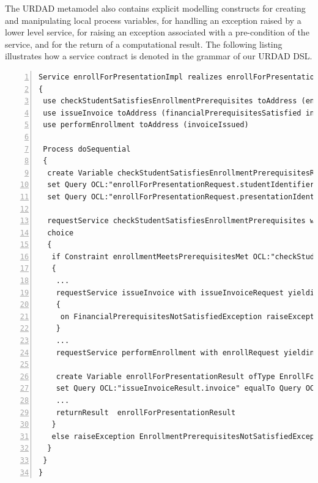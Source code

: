 The URDAD metamodel also contains explicit modelling constructs for creating and manipulating local process variables,  for handling an exception raised by a lower level service, for raising an exception associated with a pre-condition of the service, and for the return of a computational result. The following listing illustrates how a service contract is denoted in the grammar of our URDAD DSL.

\lstset{language=urdad,caption=Specifying a service in the textual URDAD DSL syntax.,label=serviceTextSyntax}
\begin{lstlisting}[numbers=left,escapechar=|]
Service enrollForPresentationImpl realizes enrollForPresentation receiving Variable enrollForPresentationRequest ofType EnrollForPresentationRequest
{
 use checkStudentSatisfiesEnrollmentPrerequisites toAddress (enrollmentPrerequisitesMet)
 use issueInvoice toAddress (financialPrerequisitesSatisfied invoiceIssued) 
 use performEnrollment toAddress (invoiceIssued)
   
 Process doSequential
 {
  create Variable checkStudentSatisfiesEnrollmentPrerequisitesRequest ofType CheckStudentSatisfiesEnrollmentPrerequisitesRequest               
  set Query OCL:"enrollForPresentationRequest.studentIdentifier" equalTo Query OCL:"checkEnrollmentPrerequisitesRequest.studentIdentifier"
  set Query OCL:"enrollForPresentationRequest.presentationIdentifier" equalTo Query OCL:"checkEnrollmentPrerequisitesRequest.presentationIdentifier"
                     
  requestService checkStudentSatisfiesEnrollmentPrerequisites with checkStudentSatisfiesEnrollmentPrerequisitesRequest yielding Variable checkStudentSatisfiesEnrollmentPrerequisitesResult ofType CheckStudentSatisfiesEnrollmentPrerequisitesResult
  choice
  {
   if Constraint enrollmentMeetsPrerequisitesMet OCL:"checkStudentSatisfiesEnrollmentPrerequisitesResult.enrollmentPrerequisitesMet = true" doSequential
   {
    ...
    requestService issueInvoice with issueInvoiceRequest yielding Variable issueInvoiceResult ofType IssueInvoiceResult
    {
     on FinancialPrerequisitesNotSatisfiedException raiseException FinancialPrerequisitesNotSatisfiedException
    }
    ...
    requestService performEnrollment with enrollRequest yielding Variable performEnrollmentResult ofType PerformEnrollmentResult
          
    create Variable enrollForPresentationResult ofType EnrollForPresentationResult
    set Query OCL:"issueInvoiceResult.invoice" equalTo Query OCL:"enrollForPresentationResult.invoice"
    ...                       
    returnResult  enrollForPresentationResult
   }
   else raiseException EnrollmentPrerequisitesNotSatisfiedException
  }
 }
}                 
\end{lstlisting}

